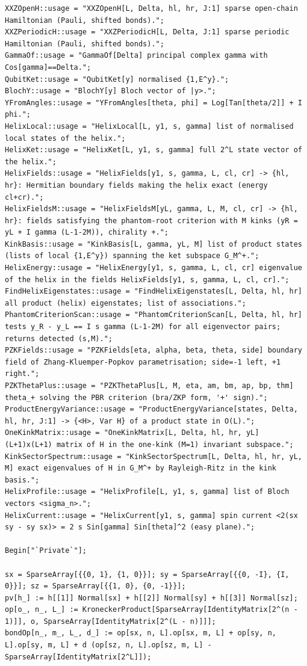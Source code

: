 \documentclass[11pt,a4paper]{article}
\theoremstyle{definition}
\begin{document}
\begin{lstlisting}
XXZOpenH::usage = "XXZOpenH[L, Delta, hl, hr, J:1] sparse open-chain Hamiltonian (Pauli, shifted bonds).";
XXZPeriodicH::usage = "XXZPeriodicH[L, Delta, J:1] sparse periodic Hamiltonian (Pauli, shifted bonds).";
GammaOf::usage = "GammaOf[Delta] principal complex gamma with Cos[gamma]==Delta.";
QubitKet::usage = "QubitKet[y] normalised {1,E^y}.";
BlochY::usage = "BlochY[y] Bloch vector of |y>.";
YFromAngles::usage = "YFromAngles[theta, phi] = Log[Tan[theta/2]] + I phi.";
HelixLocal::usage = "HelixLocal[L, y1, s, gamma] list of normalised local states of the helix.";
HelixKet::usage = "HelixKet[L, y1, s, gamma] full 2^L state vector of the helix.";
HelixFields::usage = "HelixFields[y1, s, gamma, L, cl, cr] -> {hl, hr}: Hermitian boundary fields making the helix exact (energy cl+cr).";
HelixFieldsM::usage = "HelixFieldsM[yL, gamma, L, M, cl, cr] -> {hl, hr}: fields satisfying the phantom-root criterion with M kinks (yR = yL + I gamma (L-1-2M)), chirality +.";
KinkBasis::usage = "KinkBasis[L, gamma, yL, M] list of product states (lists of local {1,E^y}) spanning the ket subspace G_M^+.";
HelixEnergy::usage = "HelixEnergy[y1, s, gamma, L, cl, cr] eigenvalue of the helix in the fields HelixFields[y1, s, gamma, L, cl, cr].";
FindHelixEigenstates::usage = "FindHelixEigenstates[L, Delta, hl, hr] all product (helix) eigenstates; list of associations.";
PhantomCriterionScan::usage = "PhantomCriterionScan[L, Delta, hl, hr] tests y_R - y_L == I s gamma (L-1-2M) for all eigenvector pairs; returns detected (s,M).";
PZKFields::usage = "PZKFields[eta, alpha, beta, theta, side] boundary field of Zhang-Kluemper-Popkov parametrisation; side=-1 left, +1 right.";
PZKThetaPlus::usage = "PZKThetaPlus[L, M, eta, am, bm, ap, bp, thm] theta_+ solving the PBR criterion (bra/ZKP form, '+' sign).";
ProductEnergyVariance::usage = "ProductEnergyVariance[states, Delta, hl, hr, J:1] -> {<H>, Var H} of a product state in O(L).";
OneKinkMatrix::usage = "OneKinkMatrix[L, Delta, hl, hr, yL] (L+1)x(L+1) matrix of H in the one-kink (M=1) invariant subspace.";
KinkSectorSpectrum::usage = "KinkSectorSpectrum[L, Delta, hl, hr, yL, M] exact eigenvalues of H in G_M^+ by Rayleigh-Ritz in the kink basis.";
HelixProfile::usage = "HelixProfile[L, y1, s, gamma] list of Bloch vectors <sigma_n>.";
HelixCurrent::usage = "HelixCurrent[y1, s, gamma] spin current <2(sx sy - sy sx)> = 2 s Sin[gamma] Sin[theta]^2 (easy plane).";

Begin["`Private`"];

sx = SparseArray[{{0, 1}, {1, 0}}]; sy = SparseArray[{{0, -I}, {I, 0}}]; sz = SparseArray[{{1, 0}, {0, -1}}];
pv[h_] := h[[1]] Normal[sx] + h[[2]] Normal[sy] + h[[3]] Normal[sz];
op[o_, n_, L_] := KroneckerProduct[SparseArray[IdentityMatrix[2^(n - 1)]], o, SparseArray[IdentityMatrix[2^(L - n)]]];
bondOp[n_, m_, L_, d_] := op[sx, n, L].op[sx, m, L] + op[sy, n, L].op[sy, m, L] + d (op[sz, n, L].op[sz, m, L] - SparseArray[IdentityMatrix[2^L]]);


\end{lstlisting}
\end{document}
